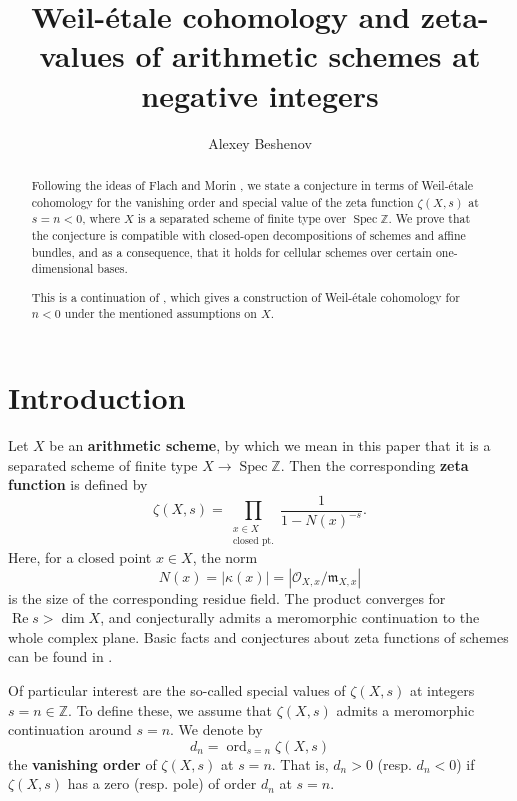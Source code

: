 \documentclass[10pt,a4paper,oneside,draft]{article}
\title{Weil-\'{e}tale cohomology and zeta-values of arithmetic schemes at
  negative integers}
\author{Alexey Beshenov}
\DeclareMathOperator{\ord}{ord}
\DeclareMathOperator{\Spec}{Spec}
\newcommand{\ZZ}{\mathbb{Z}}
\renewcommand{\Re}{\operatorname{Re}}
\theoremstyle{myplain}
\theoremstyle{mydefinition}
\numberwithin{equation}{section}
\begin{document}
\maketitle

\begin{abstract}
  Following the ideas of Flach and Morin \cite{Flach-Morin-2018}, we state a
  conjecture in terms of Weil-\'{e}tale cohomology for the vanishing order and
  special value of the zeta function $\zeta (X,s)$ at $s = n < 0$, where $X$ is
  a separated scheme of finite type over $\Spec \ZZ$. We prove that the
  conjecture is compatible with closed-open decompositions of schemes and affine
  bundles, and as a consequence, that it holds for cellular schemes over certain
  one-dimensional bases.

  This is a continuation of \cite{Beshenov-Weil-etale-1}, which gives a
  construction of Weil-\'{e}tale cohomology for $n<0$ under the mentioned
  assumptions on $X$.
\end{abstract}

\tableofcontents


\section{Introduction}

Let $X$ be an \textbf{arithmetic scheme}, by which we mean in this paper that it
is a separated scheme of finite type $X \to \Spec \ZZ$. Then the corresponding
\textbf{zeta function} is defined by
\begin{equation}
  \label{eqn:Euler-product-for-zeta}
  \zeta (X,s) = \prod_{\substack{x \in X \\ \text{closed pt.}}}
  \frac{1}{1 - N (x)^{-s}}.
\end{equation}
Here, for a closed point $x \in X$, the norm
$$N (x) = |\kappa (x)| = |\mathcal{O}_{X,x}/\mathfrak{m}_{X,x}|$$
is the size of the corresponding residue field. The product converges for
$\Re s > \dim X$, and conjecturally admits a meromorphic continuation to the
whole complex plane. Basic facts and conjectures about zeta functions of schemes
can be found in \cite{Serre-1965}.

Of particular interest are the so-called special values of $\zeta (X,s)$ at
integers $s = n \in \ZZ$. To define these, we assume that $\zeta (X,s)$ admits a
meromorphic continuation around $s = n$. We denote by
$$d_n = \ord_{s=n} \zeta (X,s)$$
the \textbf{vanishing order} of $\zeta (X,s)$ at $s = n$. That is, $d_n > 0$
(resp. $d_n < 0$) if $\zeta (X,s)$ has a zero (resp. pole) of order $d_n$ at
$s = n$.
\end{document}
